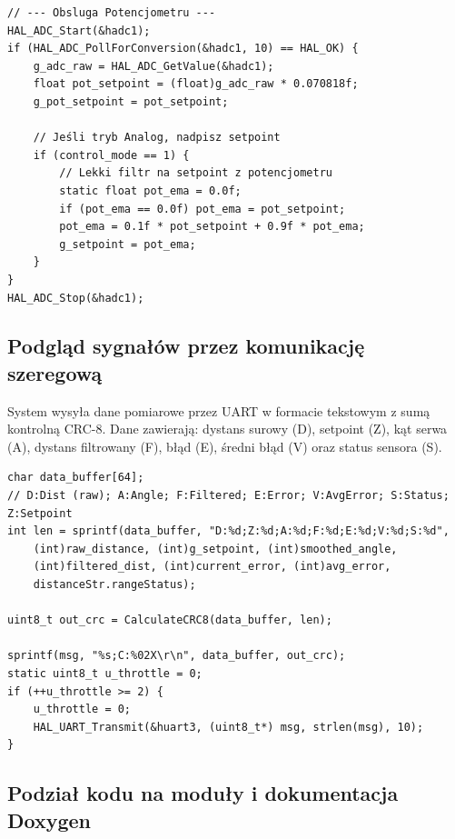 \documentclass[11pt]{article}
\begin{document}
\begin{lstlisting}[caption={Odczyt setpointu z potencjometru ADC (main.c)}, style=cstyle]
// --- Obsluga Potencjometru ---
HAL_ADC_Start(&hadc1);
if (HAL_ADC_PollForConversion(&hadc1, 10) == HAL_OK) {
    g_adc_raw = HAL_ADC_GetValue(&hadc1);
    float pot_setpoint = (float)g_adc_raw * 0.070818f; 
    g_pot_setpoint = pot_setpoint; 
    
    // Jeśli tryb Analog, nadpisz setpoint
    if (control_mode == 1) {
        // Lekki filtr na setpoint z potencjometru
        static float pot_ema = 0.0f;
        if (pot_ema == 0.0f) pot_ema = pot_setpoint;
        pot_ema = 0.1f * pot_setpoint + 0.9f * pot_ema;
        g_setpoint = pot_ema;
    }
}
HAL_ADC_Stop(&hadc1);
\end{lstlisting}

\subsection{Podgląd sygnałów przez komunikację szeregową}

System wysyła dane pomiarowe przez UART w formacie tekstowym z sumą kontrolną CRC-8. Dane zawierają: dystans surowy (D), setpoint (Z), kąt serwa (A), dystans filtrowany (F), błąd (E), średni błąd (V) oraz status sensora (S).

\begin{lstlisting}[caption={Wysyłanie danych przez UART z CRC (main.c)}, style=cstyle]
char data_buffer[64];
// D:Dist (raw); A:Angle; F:Filtered; E:Error; V:AvgError; S:Status; Z:Setpoint
int len = sprintf(data_buffer, "D:%d;Z:%d;A:%d;F:%d;E:%d;V:%d;S:%d", 
    (int)raw_distance, (int)g_setpoint, (int)smoothed_angle, 
    (int)filtered_dist, (int)current_error, (int)avg_error, 
    distanceStr.rangeStatus);

uint8_t out_crc = CalculateCRC8(data_buffer, len);

sprintf(msg, "%s;C:%02X\r\n", data_buffer, out_crc);
static uint8_t u_throttle = 0;
if (++u_throttle >= 2) {
    u_throttle = 0;
    HAL_UART_Transmit(&huart3, (uint8_t*) msg, strlen(msg), 10);
}
\end{lstlisting}

\subsection{Podział kodu na moduły i dokumentacja Doxygen}
\end{document}
